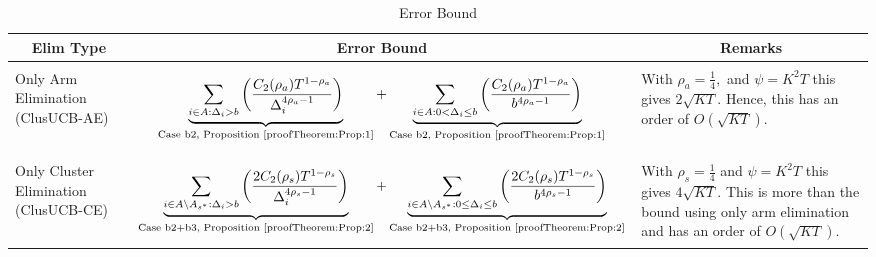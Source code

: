 \begin{table}
\caption{Error Bound}
\label{App:E:table:3}
\begin{center}
\begin{tabular}{p{1.4cm}p{10.3cm}p{3.5cm}}
\multicolumn{1}{c}{\bf Elim Type} &\multicolumn{1}{c}{\bf Error Bound} &\multicolumn{1}{c}{\bf Remarks} \\
\hline \\
Only Arm Elimination (ClusUCB-AE)	& \begin{align*}\underbrace{\sum_{i\in A:\Delta_{i} > b}\bigg(\dfrac{C_{2}(\rho_{a})T^{1-\rho_{a}}}{\Delta_{i}^{4\rho_{a} -1}} \bigg)}_{\text{Case b2, Proposition \ref{proofTheorem:Prop:1}}} + \underbrace{\sum_{i\in A:0 < \Delta_{i}\leq b}\bigg( \dfrac{C_{2}(\rho_{a})T^{1-\rho_{a}}}{b^{4\rho_{a} -1}} \bigg)}_{\text{Case b2, Proposition \ref{proofTheorem:Prop:1}}}\end{align*}  & With $\rho_{a}=\frac{1}{4},$ and $\psi=K^{2}T$ this gives $2\sqrt{KT}$. Hence, this has an order of $O(\sqrt{KT})$.\\
\hline\\
Only Cluster Elimination	 (ClusUCB-CE) & \begin{align*} \underbrace{\sum_{i\in A\setminus A_{s^*}:\Delta_{i} > b}\bigg(\dfrac{2C_{2}(\rho_{s})T^{1-\rho_{s}}}{\Delta_{i}^{4\rho_{s} -1}} \bigg)}_{\text{Case b2+b3, Proposition \ref{proofTheorem:Prop:2}}} +\underbrace{\sum_{i\in A\setminus A_{s^*}:0\leq\Delta_{i}\leq b}\bigg(\dfrac{2C_{2}(\rho_{s})T^{1-\rho_{s}}}{b^{4\rho_{s} -1}} \bigg)}_{\text{Case b2+b3, Proposition \ref{proofTheorem:Prop:2}}} \end{align*} & With $\rho_{s}=\frac{1}{4}$ and $\psi=K^{2}T$ this gives $4\sqrt{KT}$. This is more than the bound using only arm elimination and has an order of $O(\sqrt{KT})$.\\

\end{tabular}
\end{center}
\end{table}
